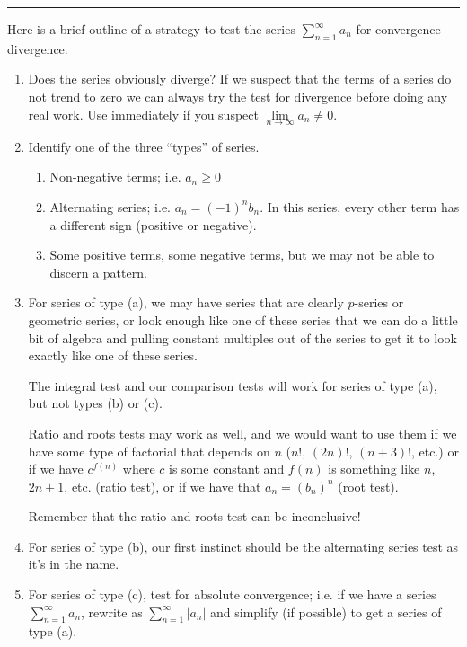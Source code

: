 \documentclass[11pt]{article}
\begin{document}
    \hrule
    \vspace{.5cm}
    Here is a brief outline of a strategy to test the series $\sum_{n=1}^{\infty}a_{n}$ for convergence divergence.
    \begin{enumerate}
        \item Does the series obviously diverge? If we suspect that the terms of a series do not trend to zero we can always try the test for divergence before doing any real work. Use immediately if you suspect $\lim\limits_{n\to\infty}a_{n}\neq0$.
        \item Identify one of the three ``types'' of series.
        \begin{enumerate}
            \item Non-negative terms; i.e. $a_{n}\geq0$
            \item Alternating series; i.e. $a_{n}=(-1)^{n}b_{n}$. In this series, every other term has a different sign (positive or negative).
            \item Some positive terms, some negative terms, but we may not be able to discern a pattern.
        \end{enumerate}
        \item For series of type (a), we may have series that are clearly $p$-series or geometric series, or look enough like one of these series that we can do a little bit of algebra and pulling constant multiples out of the series to get it to look exactly like one of these series.
        
        The integral test and our comparison tests will work for series of type (a), but not types (b) or (c).

        Ratio and roots tests may work as well, and we would want to use them if we have some type of factorial that depends on $n$ ($n!$, $(2n)!$, $(n+3)!$, etc.) or if we have $c^{f(n)}$ where $c$ is some constant and $f(n)$ is something like $n$, $2n+1$, etc. (ratio test), or if we have that $a_{n}=(b_{n})^{n}$ (root test).

        Remember that the ratio and roots test can be inconclusive!
        
        \item For series of type (b), our first instinct should be the alternating series test as it's in the name.
        
        \item For series of type (c), test for absolute convergence; i.e. if we have a series $\sum\limits_{n=1}^{\infty}a_{n}$, rewrite as $\sum\limits_{n=1}^{\infty}|a_{n}|$ and simplify (if possible) to get a series of type (a).


\end{enumerate}
\end{document}
